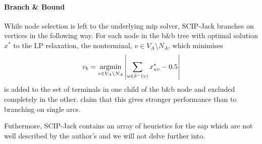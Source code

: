   \paragraph{Branch \& Bound}
  While node selection is left to the underlying \gls{mip} solver, SCIP-Jack branches on vertices in the following way. For each node in the
  b\&b tree with optimal solution $x^*$ to the LP relaxation, the nonterminal, $v \in V_A \setminus N_A$, which minimises
  $$v_b = \operatorname*{argmin}_{v \in V_A \setminus N_A} \left| \sum_{u \in \delta^-(v)} x^*_{uv} - 0.5 \right|$$
  is added to the set of terminals in one child of the b\&b node and excluded completely in the other.
  \cite{gamrath2017scip} claim that this gives stronger performance than
  to branching on single arcs.

  Futhermore, SCIP-Jack contains an array of heuristics for the \gls{sap} which are not well described
  by the author's and we will not delve further into.


